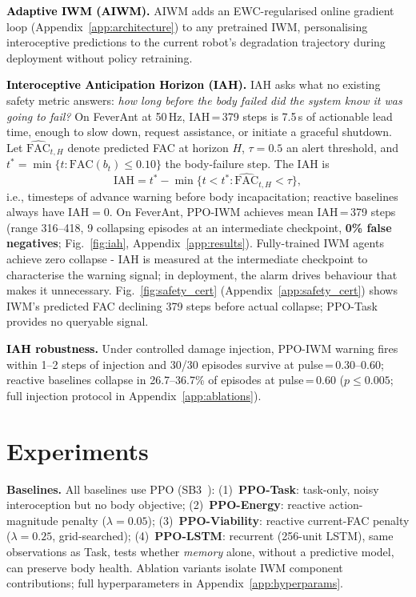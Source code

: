 \documentclass{article}
\newcommand{\methodsec}[1]{\noindent\textcolor{black}{\textbf{#1}}\enspace}
\newcommand{\fac}{\mathrm{FAC}}
\newcommand{\body}{b}
\begin{document}
{\methodsec{Adaptive IWM (AIWM).}
AIWM adds an EWC-regularised online gradient loop (Appendix~\ref{app:architecture}) to any pretrained IWM, personalising interoceptive predictions to the current robot's degradation trajectory during deployment without policy retraining.

\methodsec{Interoceptive Anticipation Horizon (IAH).}
IAH asks what no existing safety metric answers: \emph{how long before the body failed did the system know it was going to fail?}
On FeverAnt at 50\,Hz, IAH\,=\,379 steps is 7.5\,s of actionable lead time, enough to slow down, request assistance, or initiate a graceful shutdown.
Let $\hat{\fac}_{t,H}$ denote predicted FAC at horizon $H$, $\tau\!=\!0.5$ an alert threshold, and $t^*\!=\!\min\{t : \fac(\body_t)\le\!0.10\}$ the body-failure step.  The IAH is
\begin{equation}
    \mathrm{IAH} = t^* - \min\bigl\{t < t^* : \hat{\fac}_{t,H} < \tau\bigr\},
    \label{eq:iah}
\end{equation}
i.e., timesteps of advance warning before body incapacitation; reactive baselines always have $\mathrm{IAH}\!=\!0$. On FeverAnt, PPO-IWM achieves mean IAH\,=\,379 steps (range 316--418, 9 collapsing episodes at an intermediate checkpoint, \textbf{0\% false negatives}; Fig.~\ref{fig:iah}, Appendix~\ref{app:results}). Fully-trained IWM agents achieve zero collapse - IAH is measured at the intermediate checkpoint to characterise the warning signal; in deployment, the alarm drives behaviour that makes it unnecessary. Fig.~\ref{fig:safety_cert} (Appendix~\ref{app:safety_cert}) shows IWM's predicted FAC declining 379 steps before actual collapse; PPO-Task provides no queryable signal.

\methodsec{IAH robustness.}\label{sec:injection}
Under controlled damage injection, PPO-IWM warning fires within 1--2 steps of injection and 30/30 episodes survive at pulse\,=\,0.30--0.60; reactive baselines collapse in 26.7--36.7\% of episodes at pulse\,=\,0.60 ($p\!\le\!0.005$; full injection protocol in Appendix~\ref{app:ablations}).

\section{Experiments}
\label{sec:experiments}

\textbf{Baselines.}
All baselines use PPO (SB3~\citealt{raffin2021stable}): (1)~\textbf{PPO-Task}: task-only, noisy interoception but no body objective; (2)~\textbf{PPO-Energy}: reactive action-magnitude penalty ($\lambda\!=\!0.05$); (3)~\textbf{PPO-Viability}: reactive current-FAC penalty ($\lambda\!=\!0.25$, grid-searched); (4)~\textbf{PPO-LSTM}: recurrent (256-unit LSTM), same observations as Task, tests whether \emph{memory} alone, without a predictive model, can preserve body health. Ablation variants isolate IWM component contributions; full hyperparameters in Appendix~\ref{app:hyperparams}.

}
\end{document}
